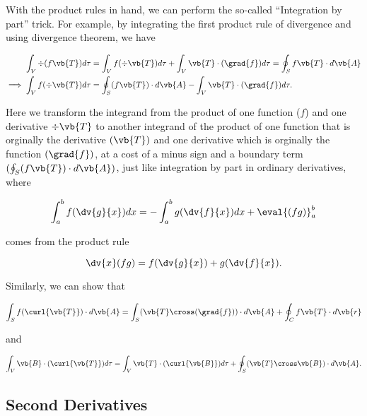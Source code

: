 \documentclass[english,a4paper,12pt]{report}
\begin{document}
With the product rules in hand, we can perform the so-called ``Integration by part'' trick. For example, by integrating the first product rule of divergence and using divergence theorem, we have
	
\begin{equation} 
	\begin{aligned}
	\int_{V} \div{(f\vb{T})} d\tau &= \int_{V} f(\div{\vb{T}}) d\tau + \int_{V} \vb{T} \cdot (\grad{f}) d\tau = \oint_{S} f\vb{T} \cdot d\vb{A} \\
	\implies \int_{V} f(\div{\vb{T}}) d\tau &= \oint_{S} (f\vb{T}) \cdot d\vb{A} - \int_{V} \vb{T} \cdot (\grad{f}) d\tau. 
	\end{aligned}
\end{equation}
	
Here we transform the integrand from the product of one function (\(f\)) and one derivative \(\div{\vb{T}}\) to another integrand of the product of one function that is orginally the derivative \((\vb{T})\) and one derivative which is orginally the function \((\grad{f})\), at a cost of a minus sign and a boundary term \((\oint_{S} (f\vb{T}) \cdot d\vb{A})\), just like integration by part in ordinary derivatives, where
	
\begin{equation} 
	\int_{a}^{b} f(\dv{g}{x})dx = -\int_{a}^{b} g(\dv{f}{x})dx + \eval{(fg)}_a^b 
\end{equation}
	
comes from the product rule
	
\begin{equation} 
	\dv{x}(fg) = f(\dv{g}{x}) + g(\dv{f}{x}). 
\end{equation}

Similarly, we can show that 
	
\begin{equation} 
	\int_{S} f(\curl{\vb{T}}) \cdot d\vb{A} = \int_{S} (\vb{T} \cross (\grad{f})) \cdot d\vb{A} + \oint_{C} f\vb{T} \cdot d\vb{r} 
\end{equation}
	
and

\begin{equation} 
	\int_{V} \vb{B} \cdot (\curl{\vb{T}}) d\tau = \int_{V} \vb{T} \cdot (\curl{\vb{B}}) d\tau + \oint_{S} (\vb{T} \cross \vb{B}) \cdot d\vb{A}. 
\end{equation}
	
\subsection{Second Derivatives}
	
\end{document}
